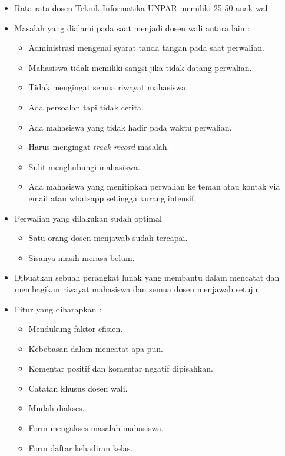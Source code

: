 \begin{itemize}
\item Rata-rata dosen Teknik Informatika UNPAR memiliki 25-50 anak wali.
\item Masalah yang dialami pada saat menjadi dosen wali antara lain :
    \begin{itemize}
    \item Administrasi mengenai syarat tanda tangan pada saat perwalian.
    \item Mahasiswa tidak memiliki sangsi jika tidak datang perwalian.
    \item Tidak mengingat semua riwayat mahasiswa.
    \item Ada persoalan tapi tidak cerita.
    \item Ada mahasiswa yang tidak hadir pada waktu perwalian.
    \item Harus mengingat {\it track record} masalah.
    \item Sulit menghubungi mahasiswa.
    \item Ada mahasiswa yang menitipkan perwalian ke teman atau kontak via email atau whatsapp sehingga kurang intensif.
    \end{itemize}
\item Perwalian yang dilakukan sudah optimal
    \begin{itemize}
    \item Satu orang dosen menjawab sudah tercapai.
    \item Sisanya masih merasa belum.
    \end{itemize}
\item Dibuatkan sebuah perangkat lunak yang membantu dalam mencatat dan membagikan riwayat mahasiswa dan semua dosen menjawab setuju.
\item Fitur yang diharapkan :
    \begin{itemize}
    \item Mendukung faktor efisien.
    \item Kebebasan dalam mencatat apa pun.
    \item Komentar positif dan komentar negatif dipisahkan.
    \item Catatan khusus dosen wali.
    \item Mudah diakses.
    \item Form mengakses masalah mahasiswa.
    \item Form daftar kehadiran kelas.
    \end{itemize}
\end{itemize}

